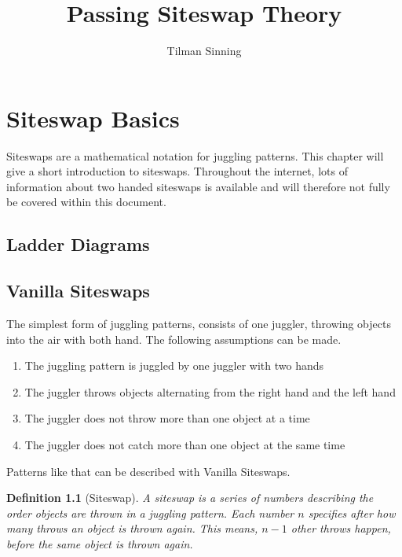\documentclass[a4paper,12pt,parskip=full]{scrreprt}
\title{Passing Siteswap Theory}
\author{Tilman Sinning}
\newtheorem{definition}{Definition}
\begin{document}
	\maketitle
	
	\tableofcontents
	
	
%	
	
	\chapter{Siteswap Basics}
	
	Siteswaps are a mathematical notation for juggling patterns. This chapter will give a short introduction to siteswaps. Throughout the internet, lots of information about two handed siteswaps is available and will therefore not fully be covered within this document.
	
	\section{Ladder Diagrams}
	
	
	
	\section{Vanilla Siteswaps}
	
	The simplest form of juggling patterns, consists of one juggler, throwing objects into the air with both hand. The following assumptions can be made.
	
	\begin{enumerate}
		\item The juggling pattern is juggled by one juggler with two hands
		\item The juggler throws objects alternating from the right hand and the left hand
		\item The juggler does not throw more than one object at a time
		\item The juggler does not catch more than one object at the same time
	\end{enumerate}

	Patterns like that can be described with Vanilla Siteswaps. 
	
	\begin{definition}[Siteswap]
		A siteswap is a series of numbers describing the order objects are thrown in a juggling pattern. Each number $n$ specifies after how many throws an object is thrown again. This means, $n-1$ other throws happen, before the same object is thrown again.
	\end{definition}
\end{document}
